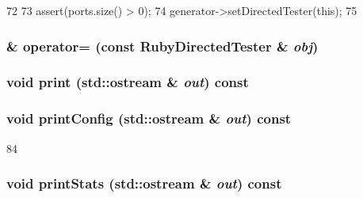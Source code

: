 \begin{DoxyCode}
72 {
73     assert(ports.size() > 0);
74     generator->setDirectedTester(this);
75 }
\end{DoxyCode}
\hypertarget{classRubyDirectedTester_aeeec8bf132659d6d6fd269419c117f89}{
\subsubsection[{operator=}]{\& operator= (const {\bf RubyDirectedTester} \& {\em obj})}}
\label{classRubyDirectedTester_aeeec8bf132659d6d6fd269419c117f89}
\hypertarget{classRubyDirectedTester_ac55fe386a101fbae38c716067c9966a0}{
\subsubsection[{print}]{\setlength{\rightskip}{0pt plus 5cm}void print (std::ostream \& {\em out}) const}}
\label{classRubyDirectedTester_ac55fe386a101fbae38c716067c9966a0}
\hypertarget{classRubyDirectedTester_a773d0e977425600264039f8941f18496}{
\subsubsection[{printConfig}]{\setlength{\rightskip}{0pt plus 5cm}void printConfig (std::ostream \& {\em out}) const}}
\label{classRubyDirectedTester_a773d0e977425600264039f8941f18496}



\begin{DoxyCode}
84 {}
\end{DoxyCode}
\hypertarget{classRubyDirectedTester_a38f932a0a623730fe10783f46d243cef}{
\subsubsection[{printStats}]{\setlength{\rightskip}{0pt plus 5cm}void printStats (std::ostream \& {\em out}) const}}
\label{classRubyDirectedTester_a38f932a0a623730fe10783f46d243cef}



